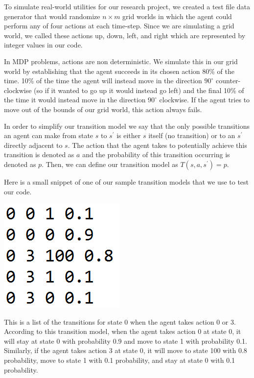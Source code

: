\documentclass[letterpaper,twocolumn,10pt]{article}
\begin{document}
{To simulate real-world utilities for our research project, we created a test file data generator that would randomize $n\times m$ grid worlds in which the agent could perform any of four actions at each time-step. Since we are simulating a grid world, we called these actions up, down, left, and right which are represented by integer values in our code.

In MDP problems, actions are non deterministic. We simulate this in our grid world by establishing that the agent succeeds in its chosen action 80\% of the time. 10\% of the time the agent will instead move in the direction $90^\circ$ counter-clockwise (so if it wanted to go up it would instead go left) and the final 10\% of the time it would instead move in the direction $90^\circ$ clockwise. If the agent tries to move out of the bounds of our grid world, this action always fails.

In order to simplify our transition model we say that the only possible transitions an agent can make from state $s$ to $s^\prime$ is either $s$ itself (no transition) or to an $s^\prime$ directly adjacent to $s$. The action that the agent takes to potentially achieve this transition is denoted as $a$ and the probability of this transition occurring is denoted as $p$. Then, we can define our transition model as $T(s,a,s^\prime)=p$.

Here is a small snippet of one of our sample transition models that we use to test our code.

\begin{center}
	\includegraphics[scale=1.0]{tmodel_snippet}
\end{center}

This is a list of the transitions for state 0 when the agent takes action 0 or 3. According to this transition model, when the agent takes action 0 at state 0, it will stay at state 0 with probability 0.9 and move to state 1 with probability 0.1. Similarly, if the agent takes action 3 at state 0, it will move to state 100 with 0.8 probability, move to state 1 with 0.1 probability, and stay at state 0 with 0.1 probability. 

}
\end{document}
